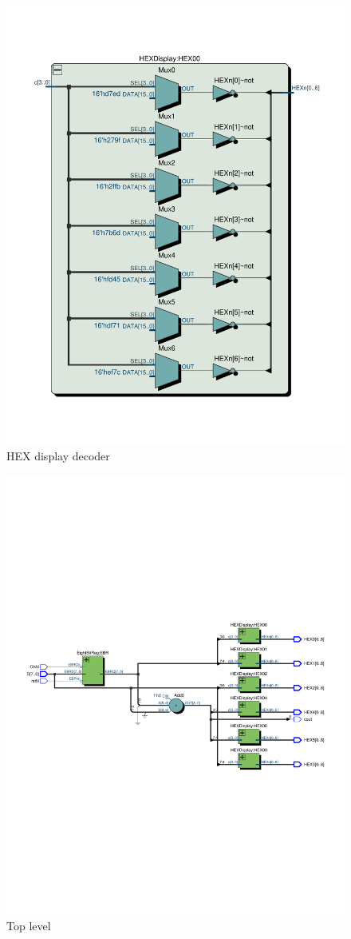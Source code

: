 \documentclass[13pt,a4paper]{report}
\begin{document}
\begin{figure}[H]
\centering
\includegraphics[scale=0.55, clip, trim={0cm 3cm 0cm 3.6cm}]{images/Exc6_HEXDisplay_RTL.pdf}
\caption*{HEX display decoder}
\end{figure}

\begin{figure}[H]
\centering
\includegraphics[scale=0.85, clip, trim={0cm 9cm 0cm 9cm}]{images/Exc6_RTL.pdf}
\caption*{Top level}
\end{figure}
\end{document}
